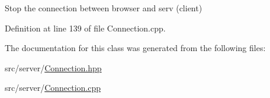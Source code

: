 Stop the connection between browser and serv (client) 



Definition at line 139 of file Connection.\+cpp.



The documentation for this class was generated from the following files\+:\begin{DoxyCompactItemize}
\item 
src/server/\hyperlink{_connection_8hpp}{Connection.\+hpp}\item 
src/server/\hyperlink{_connection_8cpp}{Connection.\+cpp}\end{DoxyCompactItemize}

